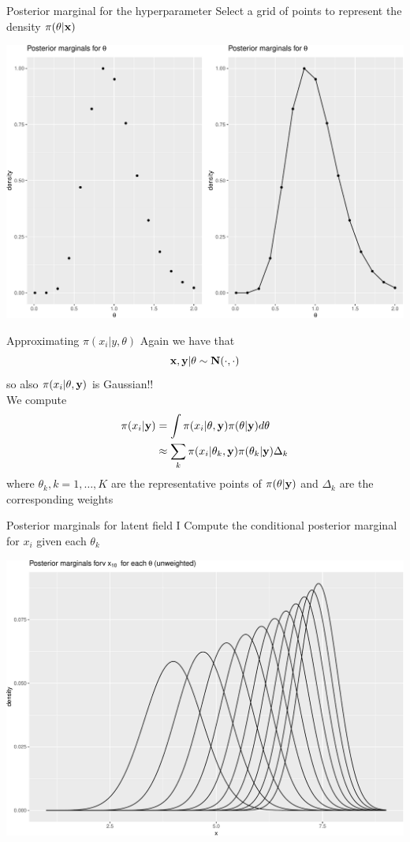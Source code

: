 \documentclass[
  ignorenonframetext,
]{beamer}
\begin{document}
\begin{frame}{Posterior marginal for the hyperparameter}
\protect\hypertarget{posterior-marginal-for-the-hyperparameter}{}
Select a grid of points to represent the density \(\pi(\theta|\bf{x})\)

\begin{center}\includegraphics[width=0.6\linewidth]{Part1_intro_files/figure-beamer/unnamed-chunk-14-1} \end{center}
\end{frame}

\begin{frame}{Approximating \(\pi(x_i|y,\theta)\)}
\protect\hypertarget{approximating-pix_iytheta}{}
Again we have that \[
    \bf{x},\bf{y}|\theta\sim\mathbf{N}(\cdot,\cdot)
\] so also \(\pi(x_i|\theta,\bf{y})\) is Gaussian!!\\

We compute \begin{align*}
\pi(x_i|{\bf y}) &= \int \pi(x_i|\theta,{\bf y})\pi(\theta|{\bf y})d\theta\\
      &\approx \sum_k\pi(x_i|\theta_k,{\bf y})\pi(\theta_k|{\bf y}) \Delta_k
\end{align*} where \(\theta_k,k=1,\dots,K\) are the representative
points of \(\pi(\theta|\bf{y})\) and \(\Delta_k\) are the corresponding
weights
\end{frame}

\begin{frame}{Posterior marginals for latent field I}
\protect\hypertarget{posterior-marginals-for-latent-field-i}{}
Compute the conditional posterior marginal for \(x_i\) given each
\(\theta_k\)\\

\begin{center}\includegraphics[width=0.6\linewidth]{Part1_intro_files/figure-beamer/unnamed-chunk-15-1} \end{center}
\end{frame}
\end{document}
